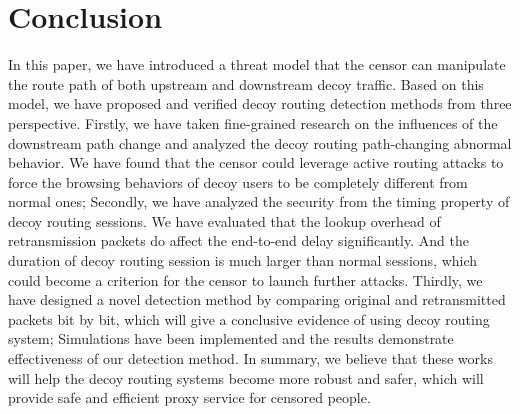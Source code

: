 \documentclass[conference]{IEEEtran}
\begin{document}



\section{Conclusion}
In this paper, we have introduced a threat model that the censor can manipulate the route path of both upstream and downstream decoy traffic. Based on this model, we have proposed and verified decoy routing detection methods from three perspective. Firstly, we have taken fine-grained research on the influences of the downstream path change and analyzed the decoy routing path-changing abnormal behavior. We have found that the censor could leverage active routing attacks to force the browsing behaviors of decoy users to be completely different from normal ones; Secondly, we have analyzed the security from the timing property of decoy routing sessions. We have evaluated that the lookup overhead of retransmission packets do affect the end-to-end delay significantly. And the duration of decoy routing session is much larger than normal sessions, which could become a criterion for the censor to launch further attacks. Thirdly, we have designed a novel detection method by comparing original and retransmitted packets bit by bit, which will give a conclusive evidence of using decoy routing system;  Simulations have been implemented and the results demonstrate effectiveness of our detection method. In summary, we believe that these works will help the decoy routing systems become more robust and safer, which will provide safe and efficient proxy service for censored people.
\end{document}
